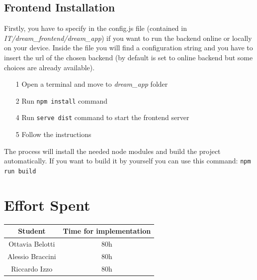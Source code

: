 \documentclass[table, 12pt]{article}
\begin{document}
\subsection{Frontend Installation}
Firstly, you have to specify in the config.js file (contained in \newline \textit{IT/dream\_frontend/dream\_app}) if you want to run the backend online or locally on your device.
Inside the file you will find a configuration string and you have to insert the url of the chosen backend
(by default is set to online backend but some choices are already available).

\begin{itemize}
    \item [1] Open a terminal and move to \textit{dream\_app} folder
    \item [2] Run \texttt{npm install} command
    \item [4] Run \texttt{serve dist} command to start the frontend server
    \item [5] Follow the instructions
\end{itemize}

The process will install the needed node modules and build the project automatically.
If you want to build it by yourself you can use this command: \texttt{npm run build}

\section{Effort Spent}
\begin{tabular}{|c||c|}
    \hline
    Student & Time for implementation\\ \hline
    Ottavia Belotti & 80h\\
    Alessio Braccini & 80h\\
    Riccardo Izzo & 80h\\
    \hline
\end{tabular}
\end{document}
